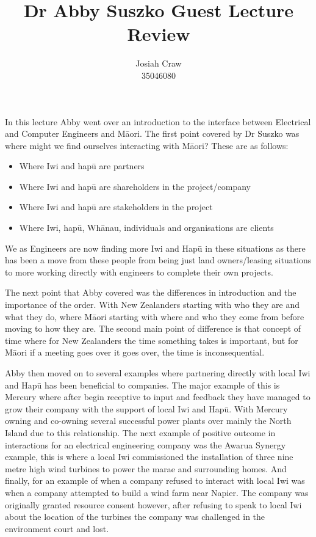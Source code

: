 \documentclass{article}
\title{Dr Abby Suszko Guest Lecture Review}
\author{Josiah Craw\\35046080}
\begin{document}
\maketitle

In this lecture Abby went over an introduction to the interface between Electrical and Computer
Engineers and M\=aori. The first point covered by Dr Suszko was where might we find ourselves
interacting with M\=aori? These are as follows:

\begin{itemize}

    \item{Where Iwi and hap\=u are partners}

    \item{Where Iwi and hap\=u are shareholders in the project/company}

    \item{Where Iwi and hap\=u are stakeholders in the project}

    \item{Where Iwi, hap\=u, Wh\=anau, individuals and organisations are clients}

\end{itemize}

We as Engineers are now finding more Iwi and Hap\=u in these situations as there has been a move
from these people from being just land owners/leasing situations to more working directly with
engineers to complete their own projects.

The next point that Abby covered was the differences in introduction and the importance of the
order. With New Zealanders starting with who they are and what they do, where M\=aori starting with
where and who they come from before moving to how they are. The second main point of difference is
that concept of time where for New Zealanders the time something takes is important, but for M\=aori
if a meeting goes over it goes over, the time is inconsequential.

Abby then moved on to several examples where partnering directly with local Iwi and Hap\=u has been
beneficial to companies. The major example of this is Mercury where after begin receptive to input
and feedback they have managed to grow their company with the support of local Iwi and Hap\=u. With
Mercury owning and co-owning several successful power plants over mainly the North Island due to
this relationship. The next example of positive outcome in interactions for an electrical engineering
company was the Awarua Synergy example, this is where a local Iwi commissioned the installation of
three nine metre high wind turbines to power the marae and surrounding homes. And finally, for an
example of when a company refused to interact with local Iwi was when a company attempted to build
a wind farm near Napier. The company was originally granted resource consent however, after refusing
to speak to local Iwi about the location of the turbines the company was challenged in the
environment court and lost.
\end{document}
